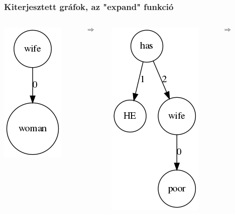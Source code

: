 \documentclass[bigger]{beamer}
\begin{document}
\begin{frame}
\frametitle{Kiterjesztett gráfok, az "expand" funkció}
\begin{columns}
	\begin{column}{0.1\textwidth}
		\pause \includegraphics[scale=0.4]{pics/wife.png}
	\end{column}
	\begin{column}{0.1\textwidth}
	\pause \[\Rightarrow\]
	\end{column}
	\begin{column}{0.2\textwidth}
		\pause \includegraphics[scale=0.4]{pics/wifepoor.png}
	\end{column}
	\begin{column}{0.1\textwidth}
		\pause \[\Rightarrow\]
	\end{column}
	\begin{column}{0.3\textwidth}

\end{column}
\end{columns}
\end{frame}
\end{document}
